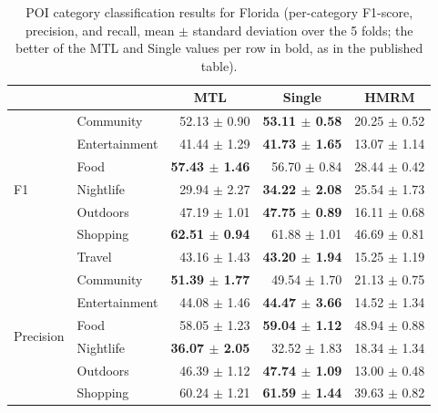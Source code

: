 \begin{table}[htbp]
\caption{POI category classification results for Florida (per-category F1-score, precision, and recall, mean $\pm$ standard deviation over the 5 folds; the better of the MTL and Single values per row in bold, as in the published table).}
\label{tab:cbic:category}
\centering
\begin{tabular}{llrrr}
\toprule
 & & \multicolumn{1}{c}{\textbf{MTL}} & \multicolumn{1}{c}{\textbf{Single}} & \multicolumn{1}{c}{\textbf{HMRM}} \\
\midrule
\multirow{7}{*}{F1}        & Community     & 52.13 $\pm$ 0.90          & \textbf{53.11 $\pm$ 0.58} & 20.25 $\pm$ 0.52 \\
                           & Entertainment & 41.44 $\pm$ 1.29          & \textbf{41.73 $\pm$ 1.65} & 13.07 $\pm$ 1.14 \\
                           & Food          & \textbf{57.43 $\pm$ 1.46} & 56.70 $\pm$ 0.84          & 28.44 $\pm$ 0.42 \\
                           & Nightlife     & 29.94 $\pm$ 2.27          & \textbf{34.22 $\pm$ 2.08} & 25.54 $\pm$ 1.73 \\
                           & Outdoors      & 47.19 $\pm$ 1.01          & \textbf{47.75 $\pm$ 0.89} & 16.11 $\pm$ 0.68 \\
                           & Shopping      & \textbf{62.51 $\pm$ 0.94} & 61.88 $\pm$ 1.01          & 46.69 $\pm$ 0.81 \\
                           & Travel        & 43.16 $\pm$ 1.43          & \textbf{43.20 $\pm$ 1.94} & 15.25 $\pm$ 1.19 \\
\midrule
\multirow{7}{*}{Precision} & Community     & \textbf{51.39 $\pm$ 1.77} & 49.54 $\pm$ 1.70          & 21.13 $\pm$ 0.75 \\
                           & Entertainment & 44.08 $\pm$ 1.46          & \textbf{44.47 $\pm$ 3.66} & 14.52 $\pm$ 1.34 \\
                           & Food          & 58.05 $\pm$ 1.23          & \textbf{59.04 $\pm$ 1.12} & 48.94 $\pm$ 0.88 \\
                           & Nightlife     & \textbf{36.07 $\pm$ 2.05} & 32.52 $\pm$ 1.83          & 18.34 $\pm$ 1.34 \\
                           & Outdoors      & 46.39 $\pm$ 1.12          & \textbf{47.74 $\pm$ 1.09} & 13.00 $\pm$ 0.48 \\
                           & Shopping      & 60.24 $\pm$ 1.21          & \textbf{61.59 $\pm$ 1.44} & 39.63 $\pm$ 0.82 \\

\end{tabular}
\end{table}
